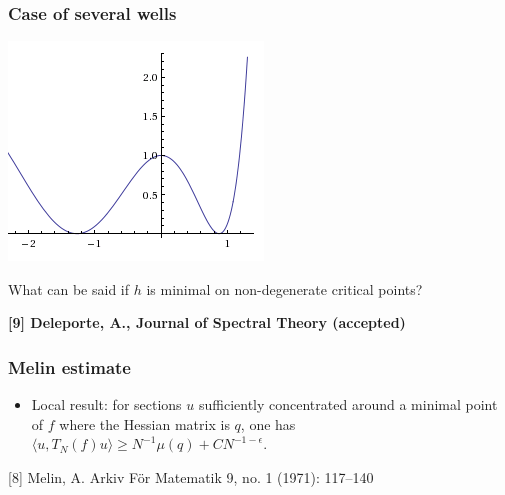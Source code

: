 \documentclass[mathserif]{beamer}
\begin{document}
\begin{frame}
  \frametitle{Case of several wells}
  \begin{minipage}[l]{0.3\linewidth}
    \includegraphics[width=\linewidth]{wells.png}
  \end{minipage}
  \begin{minipage}[r]{0.65\linewidth}
    What can be said if $h$ is minimal on non-degenerate critical
    points?
    

  \end{minipage}

  \vspace{2em}

\small{{\bfseries [9] Deleporte, A., Journal of Spectral Theory
    (accepted)}}
\end{frame}


\begin{frame}
\frametitle{Melin estimate}
\begin{itemize}
  \item Local result: for sections $u$ sufficiently concentrated around a
    minimal point of $f$ where the Hessian matrix is $q$, one has $\langle
    u,T_N(f)u\rangle \geq N^{-1}\mu(q)+CN^{-1-\epsilon}$.
  \end{itemize}

\small{
[8] Melin, A. Arkiv För Matematik 9, no. 1 (1971): 117–140}

\end{frame}
\end{document}
